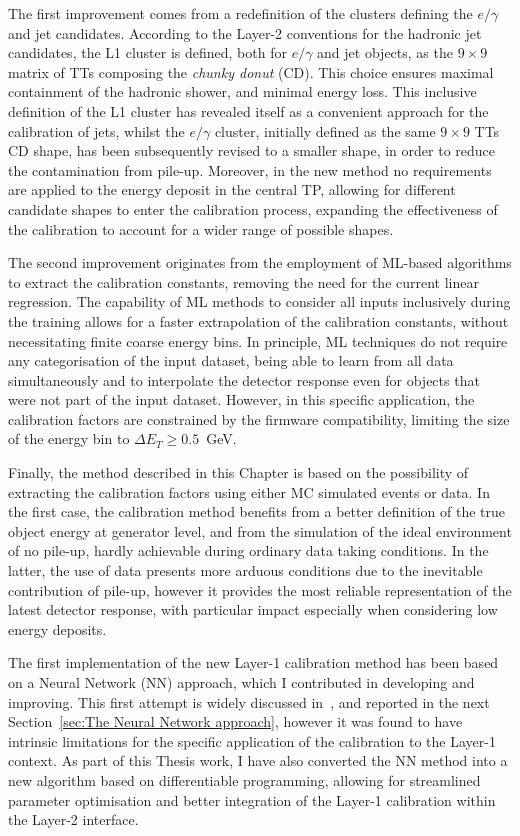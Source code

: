 The first improvement comes from a redefinition of the clusters defining the $e/\gamma$ and jet candidates. 
According to the Layer-2 conventions for the hadronic jet candidates, the L1 cluster is defined, both for $e/\gamma$ and jet objects, as the $9\times9$ matrix of TTs composing the \textit{chunky donut} (CD). This choice ensures maximal containment of the hadronic shower, and minimal energy loss. This inclusive definition of the L1 cluster has revealed itself as a convenient approach for the calibration of jets, whilst the $e/\gamma$ cluster, initially defined as the same $9\times9$ TTs CD shape, has been subsequently revised to a smaller shape, in order to reduce the contamination from pile-up. 
Moreover, in the new method no requirements are applied to the energy deposit in the central TP, allowing for different candidate shapes to enter the calibration process, expanding the effectiveness of the calibration to account for a wider range of possible shapes.

The second improvement originates from the employment of ML-based algorithms to extract the calibration constants, removing the need for the current linear regression. 
The capability of ML methods to consider all inputs inclusively during the training allows for a faster extrapolation of the calibration constants, without necessitating finite coarse energy bins. In principle, ML techniques do not require any categorisation of the input dataset, being able to learn from all data simultaneously and to interpolate the detector response even for objects that were not part of the input dataset. However, in this specific application, the calibration factors are constrained by the firmware compatibility, limiting the size of the energy bin to $\Delta E_T\geq0.5$~GeV.

Finally, the method described in this Chapter is based on the possibility of extracting the calibration factors using either MC simulated events or data. In the first case, the calibration method benefits from a better definition of the true object energy at generator level, and from the simulation of the ideal environment of no pile-up, hardly achievable during ordinary data taking conditions. In the latter, the use of data presents more arduous conditions due to the inevitable contribution of pile-up, however it provides the most reliable representation of the latest detector response, with particular impact especially when considering low energy deposits.

\bigbreak

The first implementation of the new Layer-1 calibration method has been based on a Neural Network (NN) approach, which I contributed in developing and improving. This first attempt is widely discussed in~\cite{Motta:2881939}, and reported in the next Section~\ref{sec:The Neural Network approach}, however it was found to have intrinsic limitations for the specific application of the calibration to the Layer-1 context. 
As part of this Thesis work, I have also converted the NN method into a new algorithm based on differentiable programming, allowing for streamlined parameter optimisation and better integration of the Layer-1 calibration within the Layer-2 interface.


